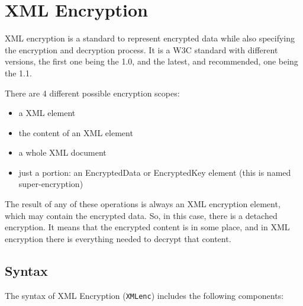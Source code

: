\section{XML Encryption}
XML encryption is a standard to represent encrypted data while also
specifying the encryption and decryption process. It is a W3C 
standard with different versions, the first one being the 1.0, and the 
latest, and recommended, one being the 1.1.

There are 4 different possible encryption scopes:
\begin{itemize}
  \item a XML element
  \item the content of an XML element
  \item a whole XML document
  \item just a portion: an EncryptedData or EncryptedKey element (this
    is named super-encryption)
\end{itemize}
The result of any of these operations is always an XML encryption
element, which may contain the encrypted data. So, in this case, there
is a detached encryption. It means that the encrypted content is in
some place, and in XML encryption there is everything needed to
decrypt that content.
\subsection{Syntax}

The syntax of XML Encryption (\texttt{XMLenc}) includes the following
components:

